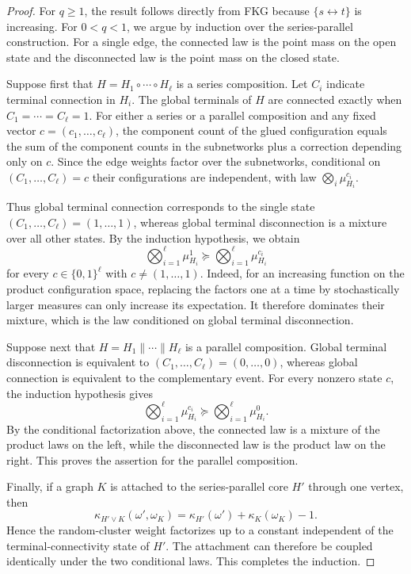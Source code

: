 \documentclass[11pt]{amsart}
\theoremstyle{plain}
\theoremstyle{definition}
\theoremstyle{remark}
\begin{document}
\begin{proof}
For $q\ge1$, the result follows directly from FKG because $\{s\leftrightarrow t\}$ is increasing. For $0<q<1$, we argue by induction over the series-parallel construction. For a single edge, the connected law is the point mass on the open state and the disconnected law is the point mass on the closed state.

Suppose first that $H=H_1\circ\cdots\circ H_\ell$ is a series composition. Let $C_i$ indicate terminal connection in $H_i$. The global terminals of $H$ are connected exactly when $C_1=\cdots=C_\ell=1$. 
For either a series or a parallel composition and any fixed vector $c=(c_1,\ldots,c_\ell)$, the component count of the glued configuration equals the sum of the component counts in the subnetworks plus a correction depending only on $c$. Since the edge weights factor over the subnetworks, conditional on $(C_1,\ldots,C_\ell)=c$ their configurations are independent, with law $\bigotimes_i\mu_{H_i}^{c_i}$.

Thus global terminal connection corresponds to the single state $(C_1,\ldots,C_\ell)=(1,\ldots,1)$, whereas global terminal disconnection is a mixture over all other states. By the induction hypothesis, we obtain
\[
    \bigotimes_{i=1}^\ell\mu_{H_i}^1
    \succeq
    \bigotimes_{i=1}^\ell\mu_{H_i}^{c_i}
\]
for every $c\in\{0,1\}^\ell$ with $c\neq(1,\ldots,1)$. Indeed, for an increasing function on the product configuration space, replacing the factors one at a time by stochastically larger measures can only increase its expectation. It therefore dominates their mixture, which is the law conditioned on global terminal disconnection.

Suppose next that $H=H_1\parallel\cdots\parallel H_\ell$ is a parallel composition. Global terminal disconnection is equivalent to $(C_1,\ldots,C_\ell)=(0,\ldots,0)$, whereas global connection is equivalent to the complementary event. For every nonzero state $c$, the induction hypothesis gives
\[
    \bigotimes_{i=1}^\ell\mu_{H_i}^{c_i}
    \succeq
    \bigotimes_{i=1}^\ell\mu_{H_i}^{0}.
\]
By the conditional factorization above, the connected law is a mixture of the product laws on the left, while the disconnected law is the product law on the right. This proves the assertion for the parallel composition.

Finally, if a graph $K$ is attached to the series-parallel core $H'$ through one vertex, then
\[
    \kappa_{H'\vee K}(\omega',\omega_K)
    =
    \kappa_{H'}(\omega')+\kappa_K(\omega_K)-1.
\]
Hence the random-cluster weight factorizes up to a constant independent of the terminal-connectivity state of $H'$. The attachment can therefore be coupled identically under the two conditional laws. This completes the induction.
\end{proof}
\end{document}
